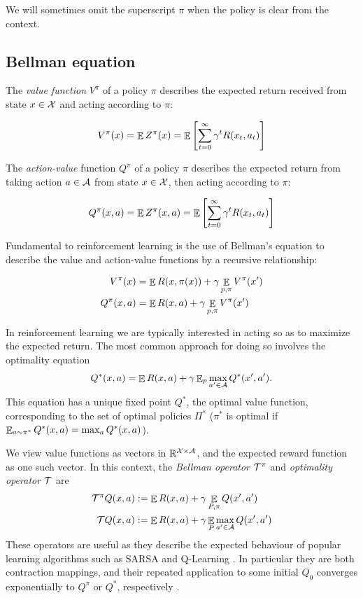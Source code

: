 We will sometimes omit the superscript $\pi$ when the policy is clear from the context.

\subsection{Bellman equation}

The \textit{value function} $V^\pi$ of a policy $\pi$ describes the expected return received from state $x \in \mathcal{X}$ and acting according to $\pi$:

\begin{equation}
V^\pi(x) = \mathop{\mathbb{E}} Z^\pi(x) = \mathop{\mathbb{E}}\left[\sum_{t=0}^\infty \gamma^tR(x_t,a_t) \right]
\end{equation}


The \textit{action-value} function $Q^\pi$ of a policy $\pi$ describes the expected return from taking action $a \in \mathcal{A}$ from state $x \in \mathcal{X}$, then acting according to $\pi$:

\begin{equation}
Q^\pi(x, a) = \mathop{\mathbb{E}} Z^\pi(x, a) = \mathop{\mathbb{E}}\left[ \sum_{t=0}^\infty \gamma^tR(x_t,a_t) \right]
\end{equation}

Fundamental to reinforcement learning is the use of Bellman’s equation \citep{bellman1957markovian} to describe the value and action-value functions by a recursive relationship:

\begin{align}
V^\pi(x) &= \mathop{\mathbb{E}} R(x, \pi(x)) + \gamma \mathop{\mathbb{E}}\limits_{p, \pi}V^\pi(x')\\
Q^\pi(x, a) &= \mathop{\mathbb{E}} R(x, a) + \gamma \mathop{\mathbb{E}}_{p, \pi}V^\pi(x')
\end{align}

In reinforcement learning we are typically interested in acting so as to maximize the expected return. The most common approach for doing so involves the optimality equation
\begin{equation*}
Q^*(x,a) = \mathop{\mathbb{E}} R(x,a) + \gamma \mathop{\mathbb{E}}\nolimits_p \max_{a' \in \mathcal{A}} Q^*(x', a') .
\end{equation*}
This equation has a unique fixed point $Q^*$, the optimal value function, corresponding to the set of optimal policies $\Pi^*$ ($\pi^*$ is optimal if $\mathop{\mathbb{E}}_{a \sim \pi^*} Q^*(x, a) = \max_a Q^*(x,a)$).

We view value functions as vectors in $\mathbb{R}^{\mathcal{X} \times \mathcal{A}}$, and the expected reward function as one such vector. In this context, the \emph{Bellman operator} $\mathcal{T}^\pi$ and \emph{optimality operator} $\mathcal{T}$ are
\begin{align}
\mathcal{T}^\pi Q(x,a) &:= \mathop{\mathbb{E}} R(x,a) + \gamma \mathop{\mathbb{E}}_{P, \pi} Q(x',a')\\
\mathcal{T} Q(x,a) &:= \mathop{\mathbb{E}} R(x,a) + \gamma \mathop{\mathbb{E}}_{P} \max_{a' \in \mathcal{A}} Q(x', a')
\end{align}
These operators are useful as they describe the expected behaviour of popular learning algorithms such as SARSA and Q-Learning \cite{sutton1998reinforcement}. In particular they are both contraction mappings, and their repeated application to some initial $Q_0$ converges exponentially to $Q^\pi$ or $Q^*$, respectively \citep{bertsekas1995neuro}.


